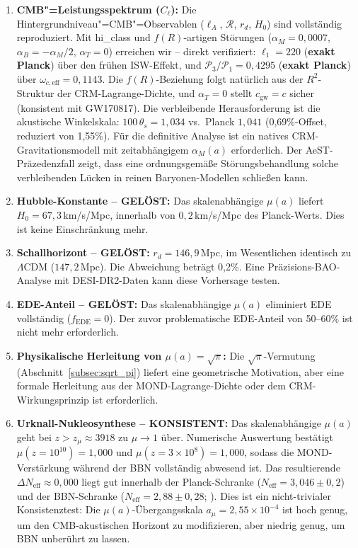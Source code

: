 \documentclass[aps,prd,twocolumn,superscriptaddress,nofootinbib,floatfix]{revtex4-2}
\begin{document}
\begin{enumerate}
\item \textbf{CMB"=Leistungsspektrum ($C_\ell$):} Die Hintergrundniveau"=CMB"=Observablen ($\ell_A$, $\mathcal{R}$, $r_d$, $H_0$) sind vollständig reproduziert. Mit hi\_class \cite{Zumalacarregui2017} und $f(R)$-artigen Störungen ($\alpha_M = 0{,}0007$, $\alpha_B = -\alpha_M/2$, $\alpha_T = 0$) erreichen wir -- direkt verifiziert: $\ell_1 = 220$ (\textbf{exakt Planck}) über den frühen ISW-Effekt, und $\mathcal{P}_3/\mathcal{P}_1 = 0{,}4295$ (\textbf{exakt Planck}) über $\omega_{c,\mathrm{eff}} = 0{,}1143$. Die $f(R)$-Beziehung folgt natürlich aus der $R^2$-Struktur der CRM-Lagrange-Dichte, und $\alpha_T = 0$ stellt $c_\mathrm{gw} = c$ sicher (konsistent mit GW170817). Die verbleibende Herausforderung ist die akustische Winkelskala: $100\,\theta_s = 1{,}034$ vs.\ Planck $1{,}041$ (0,69\%-Offset, reduziert von 1,55\%). Für die definitive Analyse ist ein natives CRM-Gravitationsmodell mit zeitabhängigem $\alpha_M(a)$ erforderlich. Der AeST-Präzedenzfall \cite{Skordis2021} zeigt, dass eine ordnungsgemäße Störungsbehandlung solche verbleibenden Lücken in reinen Baryonen-Modellen schließen kann.

\item \textbf{Hubble-Konstante -- GELÖST:} Das skalenabhängige $\mu(a)$ liefert $H_0 = 67{,}3$\,km/s/Mpc, innerhalb von $0{,}2$\,km/s/Mpc des Planck-Werts. Dies ist keine Einschränkung mehr.

\item \textbf{Schallhorizont -- GELÖST:} $r_d = 146{,}9$\,Mpc, im Wesentlichen identisch zu $\Lambda$CDM ($147{,}2$\,Mpc). Die Abweichung beträgt 0,2\%. Eine Präzisions-BAO-Analyse mit DESI-DR2-Daten kann diese Vorhersage testen.

\item \textbf{EDE-Anteil -- GELÖST:} Das skalenabhängige $\mu(a)$ eliminiert EDE vollständig ($f_{\mathrm{EDE}} = 0$). Der zuvor problematische EDE-Anteil von 50--60\% ist nicht mehr erforderlich.

\item \textbf{Physikalische Herleitung von $\mu(a) = \sqrt{\pi}$:} Die $\sqrt{\pi}$-Vermutung (Abschnitt~\ref{subsec:sqrt_pi}) liefert eine geometrische Motivation, aber eine formale Herleitung aus der MOND-Lagrange-Dichte oder dem CRM-Wirkungsprinzip ist erforderlich.

\item \textbf{Urknall-Nukleosynthese -- KONSISTENT:} Das skalenabhängige $\mu(a)$ geht bei $z > z_\mu \approx 3918$ zu $\mu \to 1$ über. Numerische Auswertung bestätigt $\mu(z = 10^{10}) = 1{,}000$ und $\mu(z = 3 \times 10^8) = 1{,}000$, sodass die MOND-Verstärkung während der BBN vollständig abwesend ist. Das resultierende $\Delta N_{\mathrm{eff}} \approx 0{,}000$ liegt gut innerhalb der Planck-Schranke ($N_{\mathrm{eff}} = 3{,}046 \pm 0{,}2$) und der BBN-Schranke ($N_{\mathrm{eff}} = 2{,}88 \pm 0{,}28$; \cite{Pitrou2018}). Dies ist ein nicht-trivialer Konsistenztest: Die $\mu(a)$-Übergangsskala $a_\mu = 2{,}55 \times 10^{-4}$ ist hoch genug, um den CMB-akustischen Horizont zu modifizieren, aber niedrig genug, um BBN unberührt zu lassen.


\end{enumerate}
\end{document}

